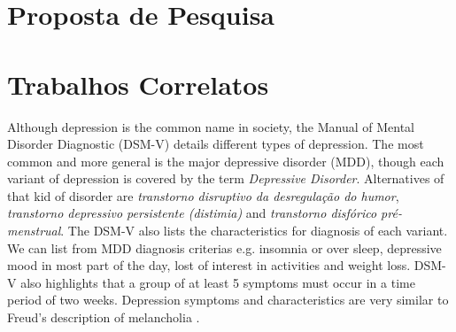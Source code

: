 \documentclass[11pt, notitlepage]{article} %
\begin{document}

\section*{Proposta de Pesquisa}

\section*{Trabalhos Correlatos}

Although depression is the common name in society, the Manual of Mental Disorder Diagnostic (DSM-V) details different types of depression. The most common and more general is the major depressive disorder (MDD), though each variant of depression is covered by the term \textit{Depressive Disorder}. Alternatives of that kid of disorder are \textit{transtorno disruptivo da desregulação do humor}, \textit{transtorno depressivo persistente (distimia)} and \textit{transtorno disfórico pré-menstrual}. The DSM-V also lists the characteristics for diagnosis of each variant. We can list from MDD diagnosis criterias e.g. insomnia or over sleep, depressive mood in most part of the day, lost of interest in activities and weight loss. DSM-V also highlights that a group of at least 5 symptoms must occur in a time period of two weeks.
Depression symptoms and characteristics are very similar to Freud's description of melancholia \cite{freud1917mourning}. 
\end{document}
